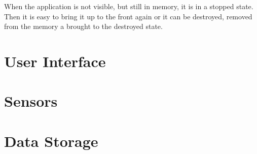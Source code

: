 When the application is not visible, but still in memory, it is in a stopped state.
Then it is easy to bring it up to the front again or it can be destroyed, removed from the memory a brought to the destroyed state.

\section{User Interface}



\section{Sensors}

\section{Data Storage}



